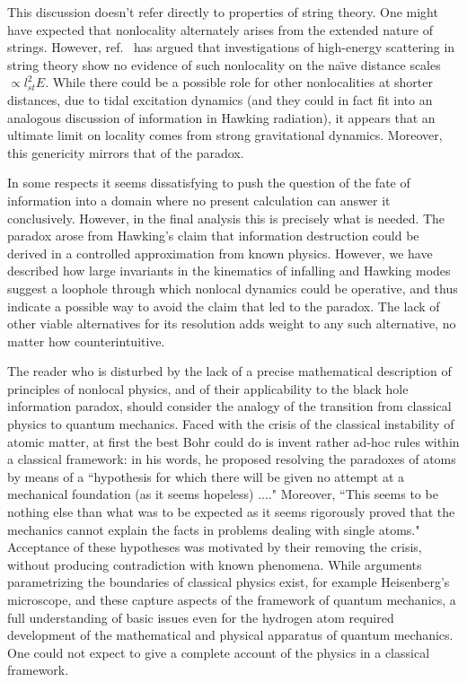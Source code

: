 This discussion doesn't refer directly to properties of string theory.  One might have expected that nonlocality alternately arises from the extended nature of strings.  However, ref.~ has argued that investigations of high-energy scattering in string theory show no evidence of such nonlocality on the na\"\i ve distance scales $\propto l_{st}^2 E$.  While there could be a possible role for other nonlocalities at shorter distances, due to tidal excitation dynamics (and they could in fact fit into an analogous discussion of information in Hawking radiation), it appears that an ultimate limit on locality comes from strong gravitational dynamics.  Moreover, this genericity mirrors that of the paradox.

In some respects it seems dissatisfying to push the question of the fate of information into a domain where no present calculation can answer it conclusively.  However, in the final analysis this is precisely what is needed.  The paradox arose from Hawking's claim that information destruction could be derived in a controlled approximation from known physics.  However, we have described how
large invariants in the kinematics of infalling and Hawking modes suggest a loophole through which nonlocal dynamics could be operative, and thus indicate a possible way to avoid the claim that led to the paradox.
The lack of other viable alternatives for its resolution adds weight to any such alternative, no matter how counterintuitive.  

The reader who is disturbed by the lack of a precise mathematical description of principles of nonlocal physics, and of their applicability to the black hole information paradox, should consider the analogy of the transition from classical physics to quantum mechanics.  Faced with the crisis of the classical instability of atomic matter, at first the best Bohr could do is invent rather ad-hoc rules within a classical framework: in his words, he proposed resolving the paradoxes of atoms by means of a ``hypothesis for which there will be given no attempt at a mechanical foundation (as it seems hopeless) ...\Bohr."  Moreover, ``This seems to be nothing else than what was to be expected as it seems rigorously proved that the mechanics cannot explain the facts in problems dealing with single atoms\Bohr."
Acceptance of these hypotheses was motivated by their removing the crisis, without producing contradiction with known phenomena.  While arguments parametrizing the boundaries of classical physics exist, for example Heisenberg's microscope, and these capture aspects of the framework of quantum mechanics, a full understanding of basic issues even for the hydrogen atom required development of the mathematical and physical apparatus of quantum mechanics.  One could not expect to give a complete account of the physics in a classical
framework.  

